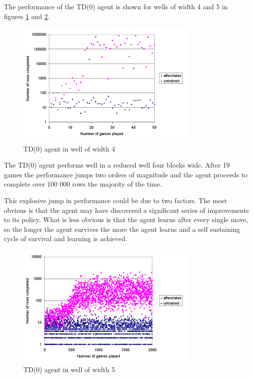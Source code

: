 \documentclass{rucsthesis}
\begin{document}
The performance of the TD(0) agent is shown for wells of width 4 and 5 in figures \ref{fig:afterstatesredtet4well} and \ref{fig:afterstatesredtet5well}.

\begin{figure}[h]
\centering
\includegraphics[width=3.5in]{afterstatesredtet4well.png}
\caption{TD(0) agent in well of width 4}
\label{fig:afterstatesredtet4well}
\end{figure}

The TD(0) agent performs well in a reduced well four blocks wide. After 19 games the performance jumps two orders of magnitude and the agent proceeds to complete over 100 000 rows the majority of the time.

This explosive jump in performance could be due to two factors. The most obvious is that the agent may have discovered a significant series of improvements to its policy. What is less obvious is that the agent learns after every single move, so the longer the agent survives the more the agent learns and a self sustaining cycle of survival and learning is achieved.

\begin{figure}[h]
\centering
\includegraphics[width=3.5in]{afterstatesredtet5well.png}
\caption{TD(0) agent in well of width 5}
\label{fig:afterstatesredtet5well}
\end{figure}
\end{document}
